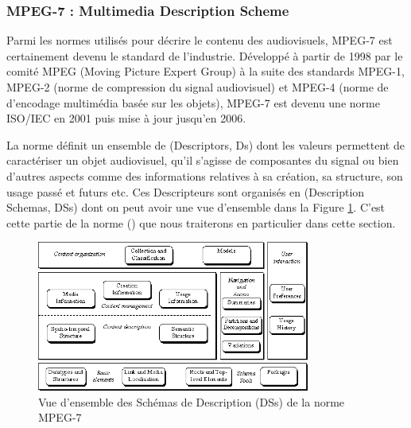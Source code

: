 \subsubsection{MPEG-7 : Multimedia Description Scheme}\label{sec:mpeg7}

Parmi les normes utilisés pour décrire le contenu des audiovisuels, MPEG-7 est certainement devenu le standard de l'industrie. 
Développé à partir de 1998 par le comité MPEG (Moving Picture Expert Group) à la suite des standards MPEG-1, MPEG-2 (norme de compression du signal audiovisuel) et MPEG-4 (norme de d'encodage multimédia basée sur les objets), MPEG-7 est devenu une norme ISO/IEC en 2001 puis mise à jour jusqu'en 2006. 

La norme définit un ensemble de  (Descriptors, Ds) dont les valeurs permettent de caractériser un objet audiovisuel, qu'il s'agisse de composantes du signal ou bien d'autres aspects comme des informations relatives à sa création, sa structure, son usage passé et futurs etc.
Ces Descripteurs sont organisés en  (Description Schemas, DSs) dont on peut avoir une vue d'ensemble dans la Figure \ref{img:soa:mds}.
C'est cette partie de la norme (\cite[Part 5 : Multimedia Description Scheme]{ISO/IEC2003}) que nous traiterons en particulier dans cette section. 

\begin{figure}[ht!]
\centering
\includegraphics[width=0.8\textwidth]{images/MPEG-7-MDS.png}
\caption{Vue d'ensemble des Schémas de Description (DSs) de la norme MPEG-7}
\label{img:soa:mds}
\end{figure}

